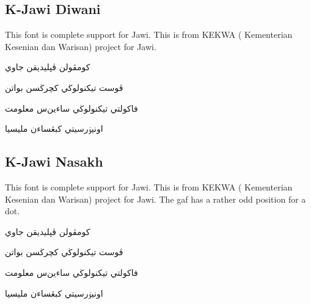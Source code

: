 \documentclass[12pt,a4paper]{IEEEconf}
\begin{document}
\subsection{K-Jawi Diwani}
This font is complete support for Jawi. This is from KEKWA ( Kementerian Kesenian dan Warisan) project for Jawi.
\newfontfamily{}

\begin{arab}
\begin{center}
کومڤولن ڤڽليديقن جاوي
\par  
ڤوست تيكنولوڬي کچرڬسن بواتن
\par  
فاکولتي تيكنولوڬي ساءين‌س معلومت
\par  
اونيۏرسيتي کبڠساءن مليسيا
\par  
\end{center}
\end{arab}

\subsection{K-Jawi Nasakh}
This font is complete support for Jawi. This is from KEKWA ( Kementerian Kesenian dan Warisan) project for Jawi.
 The gaf  has a rather odd position for a dot. 
\newfontfamily{}

\begin{arab}
\begin{center}
کومڤولن ڤڽليديقن جاوي
\par  
ڤوست تيكنولوڬي کچرڬسن بواتن
\par  
فاکولتي تيكنولوڬي ساءين‌س معلومت
\par  
اونيۏرسيتي کبڠساءن مليسيا
\par  
\end{center}
\end{arab}

% 
\end{document}
